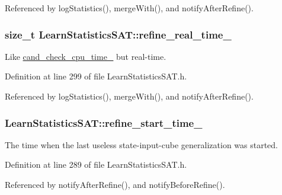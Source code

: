 Referenced by log\-Statistics(), merge\-With(), and notify\-After\-Refine().

\hypertarget{classLearnStatisticsSAT_aa36efa6b1b2bfef8ca65095952c5c35e}{
\subsubsection[{refine\-\_\-real\-\_\-time\-\_\-}]{\setlength{\rightskip}{0pt plus 5cm}size\-\_\-t Learn\-Statistics\-S\-A\-T\-::refine\-\_\-real\-\_\-time\-\_\-\hspace{0.3cm}{\ttfamily [protected]}}}\label{classLearnStatisticsSAT_aa36efa6b1b2bfef8ca65095952c5c35e}


Like \hyperlink{classLearnStatisticsSAT_a2ab5cd522b7a4d700a11c0bb430baa81}{cand\-\_\-check\-\_\-cpu\-\_\-time\-\_\-} but real-\/time. 



Definition at line 299 of file Learn\-Statistics\-S\-A\-T.\-h.



Referenced by log\-Statistics(), merge\-With(), and notify\-After\-Refine().

\hypertarget{classLearnStatisticsSAT_af358ee7d57095acbb602d9b9e1329dd2}{
\subsubsection[{refine\-\_\-start\-\_\-time\-\_\-}]{ Learn\-Statistics\-S\-A\-T\-::refine\-\_\-start\-\_\-time\-\_\-\hspace{0.3cm}{\ttfamily [protected]}}}\label{classLearnStatisticsSAT_af358ee7d57095acbb602d9b9e1329dd2}


The time when the last useless state-\/input-\/cube generalization was started. 



Definition at line 289 of file Learn\-Statistics\-S\-A\-T.\-h.



Referenced by notify\-After\-Refine(), and notify\-Before\-Refine().

